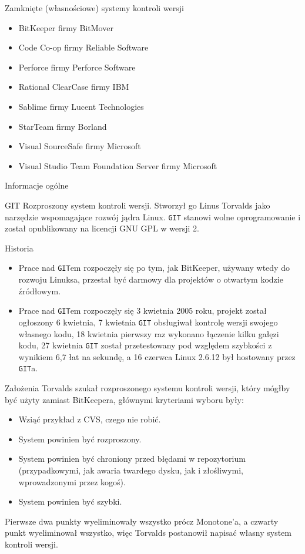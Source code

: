 \documentclass{beamer}
\begin{document}
\begin{frame}{Zamknięte (własnościowe) systemy kontroli wersji}
\begin{itemize}
  \item BitKeeper firmy BitMover
  \item Code Co-op firmy Reliable Software
  \item Perforce firmy Perforce Software
  \item Rational ClearCase firmy IBM
  \item Sablime firmy Lucent Technologies
  \item StarTeam firmy Borland
  \item Visual SourceSafe firmy Microsoft
  \item Visual Studio Team Foundation Server firmy Microsoft
\end{itemize}
\end{frame}

\begin{frame}{Informacje ogólne}
\begin{block}{GIT}
Rozproszony system kontroli wersji. Stworzył go Linus Torvalds jako narzędzie wspomagające rozwój jądra Linux. \texttt{GIT} stanowi wolne oprogramowanie i został opublikowany na licencji GNU GPL w wersji 2.
\end{block}
\end{frame}

\begin{frame}{Historia}
\begin{itemize}
	\item Prace nad \texttt{GIT}em rozpoczęły się po tym, jak BitKeeper, używany wtedy do rozwoju Linuksa, przestał być darmowy dla projektów o otwartym kodzie źródłowym. 
\vskip 1cm
	\item Prace nad \texttt{GIT}em rozpoczęły się 3 kwietnia 2005 roku, projekt został ogłoszony 6 kwietnia, 7 kwietnia \texttt{GIT} obsługiwał kontrolę wersji swojego własnego kodu, 18 kwietnia pierwszy raz wykonano łączenie kilku gałęzi kodu, 27 kwietnia \texttt{GIT} został przetestowany pod względem szybkości z wynikiem 6,7 łat na sekundę, a 16 czerwca Linux 2.6.12 był hostowany przez \texttt{GIT}a.
\end{itemize}
\end{frame}

\begin{frame}{Założenia}
Torvalds szukał rozproszonego systemu kontroli wersji, który mógłby być użyty zamiast BitKeepera, głównymi kryteriami wyboru były:
\begin{itemize}
	\item Wziąć przykład z CVS, czego nie robić.
	\item System powinien być rozproszony.
	\item System powinien być chroniony przed błędami w repozytorium (przypadkowymi, jak awaria twardego dysku, jak i złośliwymi, wprowadzonymi przez kogoś).
	\item System powinien być szybki.
\end{itemize}
Pierwsze dwa punkty wyeliminowały wszystko prócz Monotone'a, a czwarty punkt wyeliminował wszystko, więc Torvalds postanowił napisać własny system kontroli wersji.
\end{frame}
\end{document}
